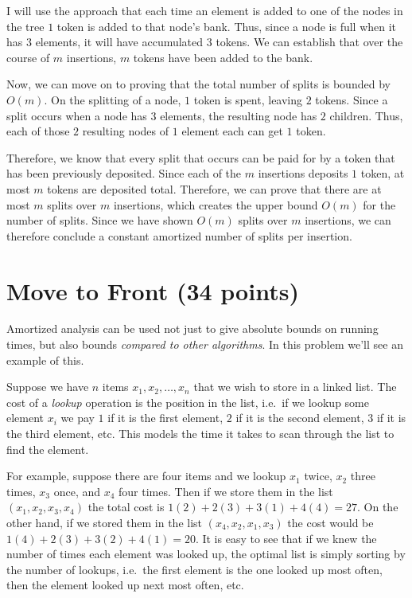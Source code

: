 \documentclass[11pt]{article}
\begin{document}
\begin{enumerate}[resume]
I will use the approach that each time an element is added to one of the nodes in the tree $1$ token is added to that node's bank. 
Thus, since a node is full when it has $3$ elements, it will have accumulated $3$ tokens. 
We can establish that over the course of $m$ insertions, $m$ tokens have been added to the bank. 

Now, we can move on to proving that the total number of splits is bounded by $O(m)$. 
On the splitting of a node, $1$ token is spent, leaving $2$ tokens. 
Since a split occurs when a node has $3$ elements, the resulting node has $2$ children. 
Thus, each of those $2$ resulting nodes of $1$ element each can get $1$ token. 

Therefore, we know that every split that occurs can be paid for by a token that has been previously deposited. 
Since each of the $m$ insertions deposits $1$ token, at most $m$ tokens are deposited total. 
Therefore, we can prove that there are at most $m$ splits over $m$ insertions, which creates the upper bound $O(m)$ for the number of splits. 
Since we have shown $O(m)$ splits over $m$ insertions, we can therefore conclude a constant amortized number of splits per insertion.

\end{enumerate}

\section{Move to Front (34 points)}
Amortized analysis can be used not just to give absolute bounds on running times, but also bounds \emph{compared to other algorithms}. 
In this problem we'll see an example of this.

Suppose we have $n$ items $x_1, x_2, \dots, x_n$ that we wish to store in a linked list.  The cost of a \emph{lookup} operation is the position in the list, 
i.e.~if we lookup some element $x_i$ we pay $1$ if it is the first element, $2$ if it is the second element, $3$ if it is the third element, etc. 
This models the time it takes to scan through the list to find the element.  

For example, suppose there are four items and we lookup $x_1$ twice, $x_2$ three times, $x_3$ once, and $x_4$ four times. 
Then if we store them in the list $(x_1, x_2, x_3, x_4)$ the total cost is $1(2) + 2(3) + 3(1) + 4(4) = 27$. 
On the other hand, if we stored them in the list $(x_4, x_2, x_1, x_3)$ the cost would be $1(4) + 2(3) + 3(2) + 4(1) = 20$. 
It is easy to see that if we knew the number of times each element was looked up, the optimal list is simply sorting by the number of lookups, 
i.e.~the first element is the one looked up most often, then the element looked up next most often, etc.  
\end{document}
